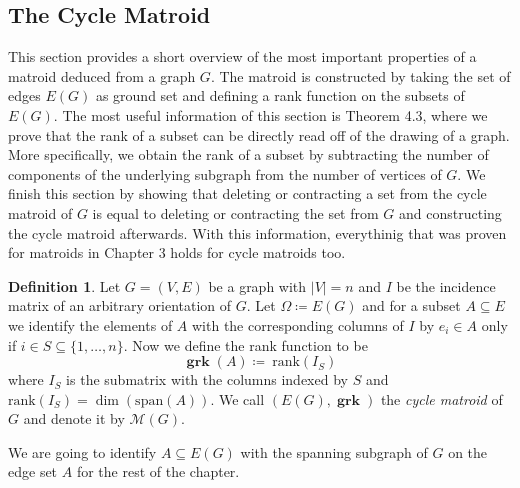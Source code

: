 \documentclass[12pt,a4paper, twoside, autooneside=false]{scrartcl}
\theoremstyle{definition}
\newtheorem{definition}[theorem]{Definition}
\theoremstyle{remark}
\numberwithin{equation}{section}
\newcommand{\M}{\mathcal{M}} %
\DeclareMathOperator{\grk}{\mathbf{grk}} %
\begin{document}
\subsection{The Cycle Matroid}
This section provides a short overview of the most important properties of a matroid deduced from a graph $G$. The matroid is constructed by taking the set of edges $E(G)$ as ground set and defining a rank function on the subsets of $E(G)$. The most useful information of this section is Theorem 4.3, where we prove that the rank of a subset can be directly read off of the drawing of a graph. More specifically, we obtain the rank of a subset by subtracting the number of components of the underlying subgraph from the number of vertices of $G$. We finish this section by showing that deleting or contracting a set from the cycle matroid of $G$ is equal to deleting or contracting the set from $G$ and constructing the cycle matroid afterwards. With this information, everythinig that was proven for matroids in Chapter 3 holds for cycle matroids too. 
\begin{definition} 
Let $G = (V,E)$ be a graph with $|V| =  n$ and $I$ be the incidence matrix of an arbitrary orientation of $G$. 
Let $\Omega \coloneqq E(G)$ and for a subset $A \subseteq E$ we identify the elements of $A$ with the corresponding columns of $I$ by $e_i \in A $ only if $i \in S \subseteq \{1, \dots, n\}$. Now we define the rank function to be
\[
\grk(A) \coloneqq \ \text{rank}(I_S)
\]
where $I_S$ is the submatrix with the columns indexed by $S$ and $\text{rank}(I_S) = \dim(\mathrm{span}(A))$. We call $(E(G), \grk)$ the \textit{cycle matroid} of $G$ and denote it by $\M(G)$.  
\end{definition}
We are going to identify $A \subseteq E(G)$ with the spanning subgraph of $G$ on the edge set $A$ for the rest of the chapter. 
\end{document}
